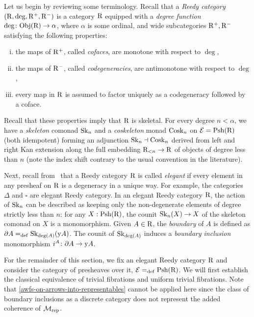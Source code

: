 \documentclass[reqno,10pt,a4paper,oneside,draft]{amsart}
\begin{document}
Let us begin by reviewing some terminology.
Recall that a \emph{Reedy category} $(\R, \deg, \Rp, \Rm)$ is a category $\R$ equipped with a \emph{degree function} $\deg \co \obj(\R) \to \alpha$, where $\alpha$ is some ordinal, and wide subcategories $\Rp, \Rm$ satisfying the following properties:
\begin{enumerate}[(i)]
\item the maps of $\Rp$, called \emph{cofaces}, are monotone with respect to $\deg$,
\item the maps of $\Rm$, called \emph{codegeneracies}, are antimonotone with respect to $\deg$,
\item every map in $\R$ is assumed to factor uniquely as a codegeneracy followed by a coface.
\end{enumerate}
Recall that these properties imply that $\R$ is skeletal.
For every degree $n < \alpha$, we have a \emph{skeleton} comonad $\Sk_n$ and a \emph{coskeleton} monad $\Cosk_n$ on $\catE = \Psh(\R)$ (both idempotent) forming an adjunction $\Sk_n \dashv \Cosk_n$ derived from left and right Kan extension along the full embedding $\R_{<n} \to \R$ of objects of degree less than $n$ (note the index shift contrary to the usual convention in the literature).

\medskip

Next, recall from~\cite{bergner-rezk-elegant} that a Reedy category $\R$ is called \emph{elegant} if every element in any presheaf on $\R$ is a degeneracy in a unique way.
For example, the categories $\Delta$ and $\square$ are elegant Reedy category.
In an elegant Reedy category $\R$, the action of $\Sk_n$ can be described as keeping only the non-degenerate elements of degree strictly less than $n$: for any $X : \Psh(\R)$, the counit $\Sk_n(X) \to X$ of the skeleton comonad on $X$ is a monomorphism.
Given $A \in \R$, the \emph{boundary} of $A$ is defined as $\partial A \defeq \Sk_{\deg(A)}(\yon A)$.
The counit of $\Sk_{\deg(A)}$ induces a \emph{boundary inclusion} monomorphism $i^A \co \partial A \to \yon A$.

\medskip

For the remainder of this section, we fix an elegant Reedy category $\R$ and consider the category of presheaves over it, $\calE \defeq \Rhat$.
We will first establish the classical equivalence of trivial fibrations and uniform trivial fibrations.
Note that \cref{awfs-on-arrows-into-representables} cannot be applied here since the class of boundary inclusions as a discrete category does not represent the added coherence of $\cal{M}_{\mathrm{rep}}$.
\end{document}
